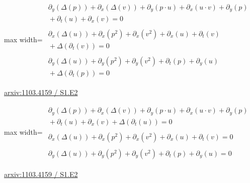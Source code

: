 \documentclass[10pt,a4paper]{article}
\begin{document}
\begin{minipage}{\linewidth}
\begin{center}\begin{adjustbox}{max width=\linewidth}$\displaystyle\begin{gathered}\begin{gathered}\partial_{y}(\Delta(p))+\partial_{x}(\Delta(v))+\partial_{y}(p\cdot u)+\partial_{x}(u\cdot v)+\partial_{y}(p)\\[-1pt]{}+\partial_{t}(u)+\partial_{x}(v)=0\end{gathered}\\[5pt]\begin{gathered}\partial_{x}(\Delta(u))+\partial_{x}(p^{2})+\partial_{x}(v^{2})+\partial_{x}(u)+\partial_{t}(v)\\[-1pt]{}+\Delta(\partial_{t}(v))=0\end{gathered}\\[5pt]\begin{gathered}\partial_{y}(\Delta(u))+\partial_{y}(p^{2})+\partial_{y}(v^{2})+\partial_{t}(p)+\partial_{y}(u)\\[-1pt]{}+\Delta(\partial_{t}(p))=0\end{gathered}\end{gathered}$\end{adjustbox}\end{center}
{\small \href{https://arxiv.org/html/1103.4159#S1.E2}{arxiv:1103.4159 / S1.E2}}\par
\end{minipage}\par\vspace{7mm}

\begin{minipage}{\linewidth}
\begin{center}\begin{adjustbox}{max width=\linewidth}$\displaystyle\begin{gathered}\begin{gathered}\partial_{y}(\Delta(p))+\partial_{x}(\Delta(v))+\partial_{y}(p\cdot u)+\partial_{x}(u\cdot v)+\partial_{y}(p)\\[-1pt]{}+\partial_{t}(u)+\partial_{x}(v)+\Delta(\partial_{t}(u))=0\end{gathered}\\[5pt]\begin{gathered}\partial_{x}(\Delta(u))+\partial_{x}(p^{2})+\partial_{x}(v^{2})+\partial_{x}(u)+\partial_{t}(v)=0\end{gathered}\\[5pt]\begin{gathered}\partial_{y}(\Delta(u))+\partial_{y}(p^{2})+\partial_{y}(v^{2})+\partial_{t}(p)+\partial_{y}(u)=0\end{gathered}\end{gathered}$\end{adjustbox}\end{center}
{\small \href{https://arxiv.org/html/1103.4159#S1.E2}{arxiv:1103.4159 / S1.E2}}\par
\end{minipage}\par\vspace{7mm}
\end{document}
